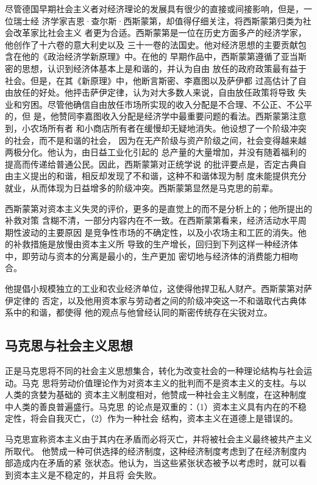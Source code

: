 尽管德国早期社会主义者对经济理论的发展具有很少的直接或间接影响，但是，一位瑞士经
济学家吉恩·查尔斯·西斯蒙第，却值得仔细关注，将西斯蒙第归类为社会改革家比社会主义
者更为合适。西斯蒙第是一位在历史方面多产的经济学家，他创作了十六卷的意大利史以及
三十一卷的法国史。他对经济思想的主要贡献包含在他的《政治经济学新原理》中。在他的
早期作品中，西斯蒙第遵循了亚当斯密的思想，认识到经济体基本上是和谐的，并认为自由
放任的政府政策最有益于社会。但是，在其《新原理》中，他断言斯密、李嘉图以及萨伊都
过高估计了自由放任的好处。他抨击萨伊定律，认为对大多数人来说，自由放任政策将导致
失业和穷困。尽管他确信自由放任市场所实现的收入分配是不合理、不公正、不公平的，但
是，他赞同李嘉图收入分配是经济学中最重要问题的看法。西斯蒙第注意到，小农场所有者
和小商店所有者在缓慢却无疑地消失。他设想了一个阶级冲突的社会，而不是和谐的社会，
因为在无产阶级与资产阶级之间，社会变得越来越两极分化。他认为，由日益工业化引起的
总产量的大量增加，并没有随着福利的提高而传递给普通公民。因此，西斯蒙第对正统学说
的批评要点是，否定古典自由主义提出的和谐，相反却发现了不和谐，这种不和谐体现为制
度未能提供充分就业，从而体现为日益增多的阶级冲突。西斯蒙第显然是马克思的前辈。

西斯蒙第对资本主义失灵的评价，更多的是直觉上的而不是分析上的；他所提出的补救对策
含糊不清，一部分内容内在不一致。在西斯蒙第看来，经济活动水平周期性波动的主要原因
是竞争性市场的不确定性，以及小农场主和工匠的消失。他的补救措施是放慢由资本主义所
导致的生产增长，回归到下列这样一种经济体中，即劳动与资本的分离是最小的，生产更加
密切地与经济体的消费能力相吻合。

他提倡小规模独立的工业和农业经济单位，这使得他捍卫私人财产。西斯蒙第对萨伊定律的
否定，以及他用资本家与劳动者之间的阶级冲突这一不和谐取代古典体系中的和谐，都使得
他的观点与他曾经认同的斯密传统存在尖锐对立。

\subsection{马克思与社会主义思想}

正是马克思将不同的社会主义思想集合，转化为改变社会的一种理论结构与社会运动。马克
思将劳动价值理论作为对资本主义的批判而不是资本主义的支柱。与以人类的贪婪为基础的
资本主义制度相对，他赞成一种社会主义制度，在这种制度中人类的善良普遍盛行。马克思
的论点是双重的：（1）资本主义具有内在的不稳定性，将会自我灭亡，（2）作为一种社会
结构，资本主义在道德上是错误的。

马克思宣称资本主义由于其内在矛盾而必将灭亡，并将被社会主义最终被共产主义所取代。
他赞成一种可供选择的经济制度，这种经济制度考虑到了在经济制度内部造成内在矛盾的紧
张状态。他认为，当这些紧张状态被予以考虑时，就可以看到资本主义是不稳定的，并且将
会失败。


